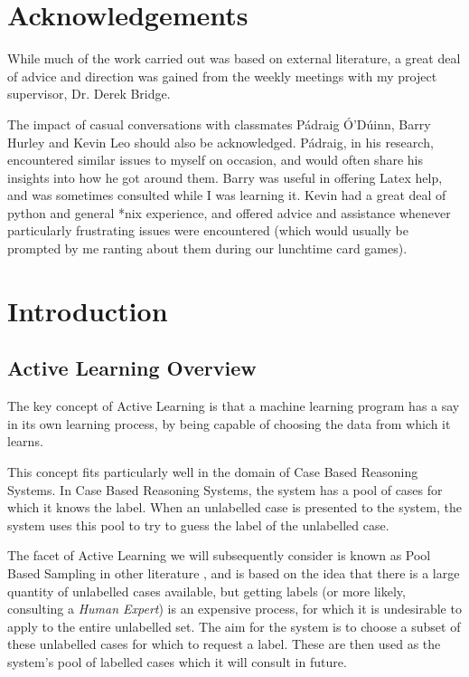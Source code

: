 \documentclass[a4paper,11pt]{report}
\begin{document}
\chapter*{Acknowledgements}
While much of the work carried out was based on external literature, a great deal of advice and direction was gained from the weekly meetings with my project supervisor, Dr. Derek Bridge.

The impact of casual conversations with classmates P\'{a}draig \'{O}'D\'{u}inn, Barry Hurley and Kevin Leo should also be acknowledged. P\'{a}draig, in his research, encountered similar issues to myself on occasion, and would often share his insights into how he got around them. Barry was useful in offering Latex help, and was sometimes consulted while I was learning it. Kevin had a great deal of python and general *nix experience, and offered advice and assistance whenever particularly frustrating issues were encountered (which would usually be prompted by me ranting about them during our lunchtime card games).

\tableofcontents

\chapter{Introduction}
\section{Active Learning Overview}
The key concept of Active Learning is that a machine learning program has a say in its own learning process, by being capable of choosing the data from which it learns. 

This concept fits particularly well in the domain of Case Based Reasoning Systems. In Case Based Reasoning Systems, the system has a pool of cases for which it knows the label. When an unlabelled case is presented to the system, the system uses this pool to try to guess the label of the unlabelled case.

The facet of Active Learning we will subsequently consider is known as Pool Based Sampling in other literature \cite{Settles2010}, and is based on the idea that there is a large quantity of unlabelled cases available, but getting labels (or more likely, consulting a \emph{Human Expert}) is an expensive process, for which it is undesirable to apply to the entire unlabelled set. The aim for the system is to choose a subset of these unlabelled cases for which to request a label. These are then used as the system's pool of labelled cases which it will consult in future.
\end{document}
